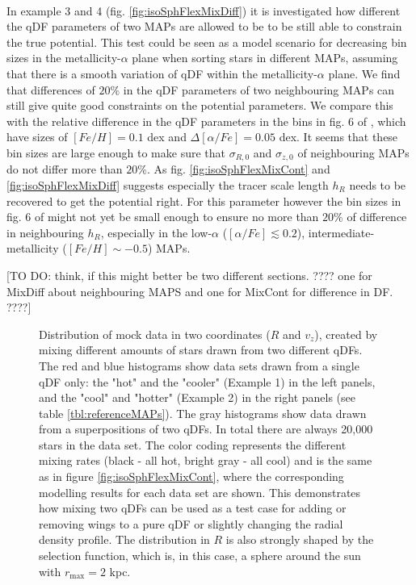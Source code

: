 \\In example 3 and 4 (fig. \ref{fig:isoSphFlexMixDiff}) it is investigated how different the qDF parameters of two MAPs are allowed to be to be still able to constrain the true potential. This test could be seen as a model scenario for decreasing bin sizes in the metallicity-$\alpha$ plane when sorting stars in different MAPs, assuming that there is a smooth variation of qDF within the metallicity-$\alpha$ plane. We find that differences of $20\%$ in the qDF parameters of two neighbouring MAPs can still give quite good constraints on the potential parameters. We compare this with the relative difference in the qDF parameters in the bins in fig. 6 of \cite{bov13}, which have sizes of $[Fe/H] = 0.1$ dex and $\Delta [\alpha/Fe] = 0.05$ dex. It seems that these bin sizes are large enough to make sure that $\sigma_{R,0}$ and $\sigma_{z,0}$ of neighbouring MAPs do not differ more than $20\%$. As fig. \ref{fig:isoSphFlexMixCont} and \ref{fig:isoSphFlexMixDiff} suggests especially the tracer scale length $h_R$ needs to be recovered to get the potential right. For this parameter however the bin sizes in fig. 6 of \cite{bov13} might not yet be small enough to ensure no more than $20\%$ of difference in neighbouring $h_R$, especially in the low-$\alpha$ ($[\alpha/Fe] \lesssim 0.2$), intermediate-metallicity ($[Fe/H] \sim -0.5$) MAPs.

[TO DO: think, if this might better be two different sections. ???? one for MixDiff about neighbouring MAPS and one for MixCont for difference in DF. ????]



\begin{figure}
\caption{Distribution of mock data in two coordinates ($R$ and $v_z$), created by mixing different amounts of stars drawn from two different qDFs. The red and blue histograms show data sets drawn from a single qDF only: the "hot" and the "cooler" \MAPs (Example 1) in the left panels, and the "cool" and "hotter" \MAPs (Example 2) in the right panels (see table \ref{tbl:referenceMAPs}). The gray histograms show data drawn from a superpositions of two qDFs. In total there are always 20,000 stars in the data set. The color coding represents the different mixing rates (black - all hot, bright gray - all cool) and is the same as in figure \ref{fig:isoSphFlexMixCont}, where the corresponding modelling results for each data set are shown. This demonstrates how mixing two qDFs can be used as a test case for adding or removing wings to a pure qDF or slightly changing the radial density profile. The distribution in $R$ is also strongly shaped by the selection function, which is, in this case, a sphere around the sun with $r_\text{max}=2$ kpc.}
\label{fig:isoSphFlexMixCont_mockdata}
\end{figure}

